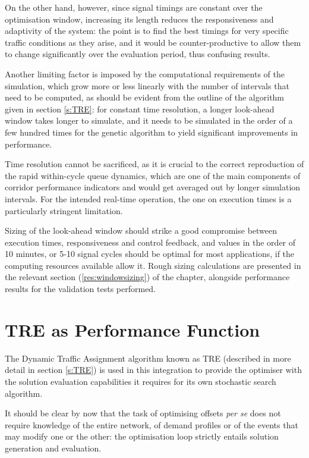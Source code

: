 On the other hand, however, since signal timings are constant over the optimisation window, increasing its length reduces the responsiveness and adaptivity of the system: the point is to find the best timings for very specific traffic conditions as they arise, and it would be counter-productive to allow them to change significantly over the evaluation period, thus confusing results.

Another limiting factor is imposed by the computational requirements of the simulation, which grow more or less linearly with the number of intervals that need to be computed, as should be evident from the outline of the algorithm given in section \ref{s:TRE}: for constant time resolution, a longer look-ahead window takes longer to simulate, and it needs to be simulated in the order of a few hundred times for the genetic algorithm to yield significant improvements in performance. 

Time resolution cannot be sacrificed, as it is crucial to the correct reproduction of the rapid within-cycle queue dynamics, which are one of the main components of corridor performance indicators and would get averaged out by longer simulation intervals. For the intended real-time operation, the one on execution times is a particularly stringent limitation.

Sizing of the look-ahead window should strike a good compromise between execution times, responsiveness and control feedback, and values in the order of 10 minutes, or 5-10 signal cycles should be optimal for most applications, if the computing resources available allow it.
Rough sizing calculations are presented in the relevant section (\ref{res:windowsizing}) of the  chapter, alongside performance results for the validation tests performed.

\section{TRE as Performance Function} \label{s:rollingtre}
The Dynamic Traffic Assignment algorithm known as TRE (described in more detail in section \ref{s:TRE}) is used in this integration to provide the optimiser with the solution evaluation capabilities it requires for its own stochastic search algorithm.

It should be clear by now that the task of optimising offsets \emph{per se} does not require knowledge of the entire network, of demand profiles or of the events that may modify one or the other: the optimisation loop strictly entails solution generation and evaluation.

